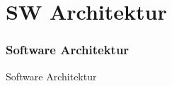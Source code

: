 
\section{SW Architektur}
\begin{frame}[fragile]
	\frametitle{Software Architektur}
\huge Software Architektur
\end{frame}
